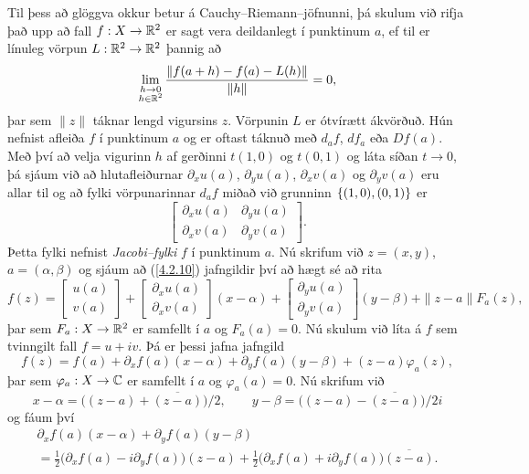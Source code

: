 Til þess að glöggva okkur betur á Cauchy--Riemann--jöfnunni, þá skulum
við rifja það upp að fall $f:X\to {\mathbb R}^2$ er sagt vera deildanlegt í
punktinum $a$, ef til er línuleg vörpun $L:{\mathbb R}^2\to {\mathbb R}^2$ þannig að
\begin{equation} \label{4.2.10}
\lim_{\substack{h\to 0\\ h\in {\mathbb R}^2}}
\dfrac{\| f(a+h)-f(a)-L(h)\|}{\|h\|}= 0,
\end{equation}
þar sem $\|z\|$ táknar lengd vigursins $z$.  Vörpunin $L$ er ótvírætt
ákvörðuð.  Hún nefnist afleiða $f$ í punktinum $a$ og er oftast táknuð
með $d_af$, $df_a$ eða $Df(a)$.    Með því að velja vigurinn $h$ af
gerðinni $t(1,0)$ og $t(0,1)$ og láta síðan $t\to 0$, þá sjáum við að hlutafleiðurnar 
${\partial}_xu(a)$, ${\partial}_yu(a)$, ${\partial}_xv(a)$ og 
 ${\partial}_yv(a)$ eru allar til og að fylki vörpunarinnar $d_af$ miðað
við grunninn ${\{(1,0), (0,1)\}}$ er
\begin{equation*}
\left[\begin{matrix} 
{\partial}_xu(a) & {\partial}_yu(a)\\
{\partial}_xv(a) & {\partial}_yv(a)
\end{matrix}\right].
\label{4.2.11}
\end{equation*} 
Þetta fylki nefnist {\it Jacobi--fylki} $f$ í punktinum $a$.  Nú skrifum
við $z=(x,y)$, $a=({\alpha},{\beta})$ og sjáum að (\ref{4.2.10}) jafngildir
því að hægt sé að rita
\begin{equation*}
f(z)=\left[\begin{matrix}
u(a) \\ v(a)
\end{matrix}\right]+
\left[\begin{matrix}
{\partial}_xu(a) \\ {\partial}_xv(a)
\end{matrix}\right](x-{\alpha})+
\left[\begin{matrix}
{\partial}_yu(a) \\ {\partial}_yv(a)
\end{matrix}\right](y-{\beta})+
\|z-a\|F_a(z), \label{4.2.12}
\end{equation*}
þar sem $F_a:X\to {\mathbb R}^2$ er samfellt í $a$ og $F_a(a)=0$.  Nú skulum við
líta á $f$ sem tvinngilt fall $f=u+iv$.  Þá er þessi jafna jafngild
\begin{equation}
f(z)=f(a)+ {\partial}_xf(a)(x-{\alpha})+{\partial}_yf(a)(y-{\beta})
+(z-a)\varphi_a(z),
\label{4.2.13}
\end{equation}
þar sem $\varphi_a:X\to {\mathbb C}$ er samfellt í $a$ og $\varphi_a(a)=0$.  Nú
skrifum við 
$$
x-{\alpha}=\big((z-a)+\overline{(z-a)}\big)/2, \qquad
y-{\beta}=\big((z-a)-\overline{(z-a)}\big)/2i
$$ 
og fáum því 
\begin{multline*}
{\partial}_xf(a)(x-{\alpha})+{\partial}_yf(a)(y-{\beta})  \\
=\tfrac 12\big({\partial}_xf(a)-i{\partial}_yf(a)\big)(z-a)
+\tfrac 12\big({\partial}_xf(a)+i{\partial}_yf(a)\big)\overline{(z-a)}.
\end{multline*}

